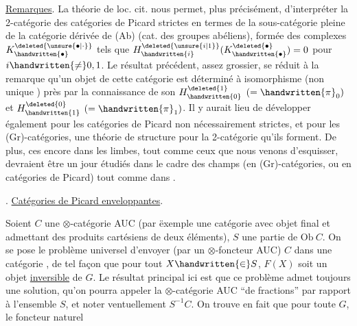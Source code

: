 \uline{Remarques}. La théorie de loc. cit. nous permet, plus précisément, d'interpréter la 2-catégorie des catégories de Picard strictes en termes de la sous-catégorie pleine de la catégorie dérivée de (Ab) (cat. des groupes abéliens), formée des complexes $K^{\deleted{\unsure{\bullet|\cdot}}}_{\handwritten{\bullet}}$ tels que $H^{\deleted{\unsure{i|1}}}_{\handwritten{i}}(K^{\deleted{\bullet}}_{\handwritten{\bullet}})=0$ pour $i\handwritten{\ne}0,1$. Le résultat précédent, assez grossier, se réduit  à la remarque qu'un objet de cette catégorie est déterminé à isomorphisme (non unique \handwritten{!}) près par la connaissance de son $H^{\deleted{1}}_{\handwritten{0}}$ $(=\handwritten{\pi}_{0})$ et $H^{\deleted{0}}_{\handwritten{1}}$ $(=\handwritten{\pi}_{1})$. Il y aurait lieu de développer également pour les catégories de Picard non nécessairement strictes, et pour les (Gr)-catégories, une théorie de structure pour la 2-catégorie qu'ils forment. De plus, ces  encore dans les limbes, tout comme ceux que  nous venons d'esquisser, devraient être un jour  étudiés dans le cadre des champs (en (Gr)-catégories, ou en catégories de Picard) tout comme dans  \handwritten{[\, ]}.

 . \uline{Catégories de Picard enveloppantes}.

Soient $C$ une  $\otimes$-catégorie AUC (par ëxemple une catégorie avec objet final et admettant des produits cartésiens de deux éléments), $S$ une partie de $\mathrm{Ob}\ C$. On se pose le problème universel d'envoyer (par un $\otimes$-foncteur AUC) $C$ dans une \inserted{$\otimes$-}catégorie , de tel façon que pour tout $X\handwritten{\in} S$, $F(X)$ soit un objet \uline{inversible} de $G$. Le résultat principal ici est que ce problème admet toujours une solution, qu'on pourra appeler la $\otimes$-catégorie AUC ``de fractions'' par rapport à l'ensemble $S$, et noter ventuellement $S^{-1}C$. On trouve en fait que pour toute $G$, le foncteur naturel
